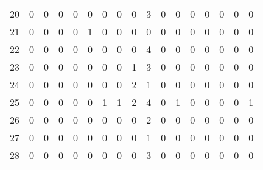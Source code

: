 \begin{tabular}{lrrrrrrrrrrrrrrrr}
20       &          0 &              0 &    0 &           0 &               0 &            0 &      0 &        0 &      3 &    0 &    0 &         0 &           0 &       0 &         0 &       0 \\
21       &          0 &              0 &    0 &           0 &               1 &            0 &      0 &        0 &      0 &    0 &    0 &         0 &           0 &       0 &         0 &       0 \\
22       &          0 &              0 &    0 &           0 &               0 &            0 &      0 &        0 &      4 &    0 &    0 &         0 &           0 &       0 &         0 &       0 \\
23       &          0 &              0 &    0 &           0 &               0 &            0 &      0 &        1 &      3 &    0 &    0 &         0 &           0 &       0 &         0 &       0 \\
24       &          0 &              0 &    0 &           0 &               0 &            0 &      0 &        2 &      1 &    0 &    0 &         0 &           0 &       0 &         0 &       0 \\
25       &          0 &              0 &    0 &           0 &               0 &            1 &      1 &        2 &      4 &    0 &    1 &         0 &           0 &       0 &         0 &       1 \\
26       &          0 &              0 &    0 &           0 &               0 &            0 &      0 &        0 &      2 &    0 &    0 &         0 &           0 &       0 &         0 &       0 \\
27       &          0 &              0 &    0 &           0 &               0 &            0 &      0 &        0 &      1 &    0 &    0 &         0 &           0 &       0 &         0 &       0 \\
28       &          0 &              0 &    0 &           0 &               0 &            0 &      0 &        0 &      3 &    0 &    0 &         0 &           0 &       0 &         0 &       0 \\
\bottomrule
\end{tabular}
